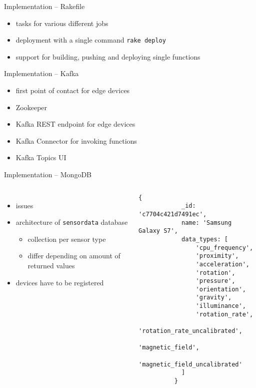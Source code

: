 \documentclass[aspectratio=169]{beamer}
\begin{document}
  
  

  \begin{frame}{Implementation -- Rakefile}
    \begin{itemize}
      \item tasks for various different jobs
      \item deployment with a single command \lstinline{rake deploy}
      \item support for building, pushing and deploying single functions
    \end{itemize}
  \end{frame}

  \begin{frame}{Implementation -- Kafka}
    \begin{itemize}
      \item first point of contact for edge devices
      \item Zookeeper
      \item Kafka REST endpoint for edge devices
      \item Kafka Connector for invoking functions
      \item Kafka Topics UI
    \end{itemize}
  \end{frame}

  \begin{frame}[fragile]{Implementation -- MongoDB}
    \begin{columns}
        \begin{itemize}
          \item issues
          \item architecture of \texttt{sensordata} database
            \begin{itemize}
              \item collection per sensor type
              \item differ depending on amount of returned values
            \end{itemize}
          \item devices have to be registered
        \end{itemize}
          \begin{lstlisting}[language=mongo, basicstyle=\scriptsize\ttfamily]
          {
            _id: 'c7704c421d7491ec',
            name: 'Samsung Galaxy S7',
            data_types: [
                'cpu_frequency',
                'proximity',
                'acceleration',
                'rotation',
                'pressure',
                'orientation',
                'gravity',
                'illuminance',
                'rotation_rate',
                'rotation_rate_uncalibrated',
                'magnetic_field',
                'magnetic_field_uncalibrated'
            ]
          }
          \end{lstlisting}
     \end{columns}
  \end{frame}
\end{document}
